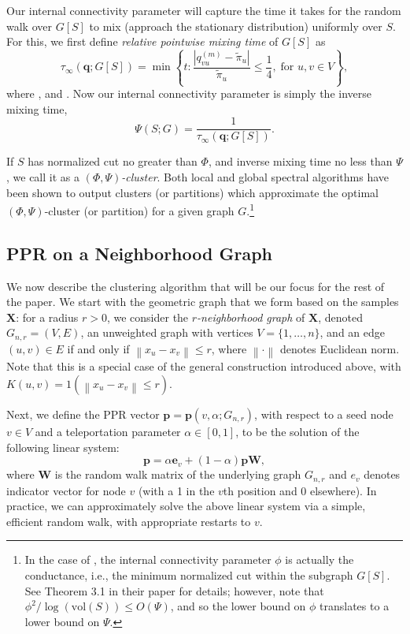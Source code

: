 \documentclass{article}
\newcommand{\set}[1]{\left\{#1\right\}}
\newcommand{\vol}{\mathrm{vol}}
\newcommand{\norm}[1]{\left\lVert#1\right\rVert}
\newcommand{\1}{\mathbf{1}}
\newcommand{\pbf}{\mathbf{p}}
\newcommand{\qbf}{\mathbf{q}}
\newcommand{\ebf}[1]{\mathbf{e}_{#1}}
\newcommand{\Xbf}{\mathbf{X}}
\newcommand{\Wbf}{\mathbf{W}}
\theoremstyle{aldenthm}
\theoremstyle{aldenrmrk}
\begin{document}
Our internal connectivity parameter will capture the time it takes for the
random walk over $G[S]$ to mix (approach the stationary distribution)
uniformly over $S$.  For this, we first define \emph{relative pointwise mixing
  time} of $G[S]$ as 
\begin{equation*}
\tau_{\infty}(\qbf; G[S]) = \min\set{ t: \frac{|q_{vu}^{(m)} -
      \tilde\pi_u|}{\tilde\pi_u} \leq \frac{1}{4}, \; \text{for $u,v \in V$}}, 
\end{equation*}
where \smash{$\qbf = (\qbf_v^{(1)}, \qbf_v^{(2)}, ...)_{v \in V}$}, and
\smash{$\qbf_v^{(m)} = (q_{vu}^{(m)})_{u \in V}$}. Now our internal 
connectivity parameter is simply the inverse mixing time,
\begin{equation}
\label{eqn: inv_mixing_time}
\Psi(S; G) = \frac{1}{\tau_{\infty}(\qbf; G[S])}.
\end{equation}

If $S$ has normalized cut no greater than $\Phi$, and inverse mixing time no
less than $\Psi$, we call it as a \emph{$(\Phi,\Psi)$-cluster}. Both
local \citep{zhu2013} and global \citep{kannan04} spectral algorithms have been
shown to output clusters (or partitions) which approximate the optimal $(\Phi,
\Psi)$-cluster (or partition) for a given graph $G$.\footnote{In the case of
  \citet{kannan04}, the internal connectivity parameter $\phi$ is actually the
  conductance, i.e., the minimum normalized cut within the subgraph $G[S]$. See
  Theorem 3.1 in their paper for details; however, note that $\phi^2 /
  \log(\vol(S)) \leq O(\Psi)$, and so the lower bound on $\phi$ translates to a
  lower bound on $\Psi$.}   

\subsection{PPR on a Neighborhood Graph}

We now describe the clustering algorithm that will be our focus for the rest of 
the paper. We start with the geometric graph that we form based on the samples 
$\Xbf$: for a radius $r > 0$, we consider the \emph{$r$-neighborhood graph} of 
$\Xbf$, denoted $G_{n,r}=(V,E)$, an unweighted graph with vertices
$V=\{1,\ldots,n\}$, and an edge $(u,v) \in E$ if and only if $\norm{x_u - x_v}
\leq  r$, where $\norm{\cdot}$ denotes Euclidean norm.  Note that this is a
special case of the general construction introduced above, with 
$K(u,v) = 1(\norm{x_u - x_v} \leq r)$. 

Next, we define the PPR vector $\pbf = \pbf(v,\alpha;G_{n,r})$, with respect to  
a seed node $v \in V$ and a teleportation parameter $\alpha \in [0,1]$, to be
the solution of the following linear system:
\begin{equation}
\label{eqn: ppr_vector}
\pbf = \alpha \ebf{v} + (1 - \alpha) \pbf \Wbf,
\end{equation}
where $\Wbf$ is the random walk matrix of the underlying graph $G_{n,r}$ 
and $e_{v}$ denotes indicator vector for node $v$ (with a 1 in the $v$th
position and 0 elsewhere).  In practice, we can approximately solve the above
linear system via a simple, efficient random walk, with appropriate restarts to
$v$. 
\end{document}

